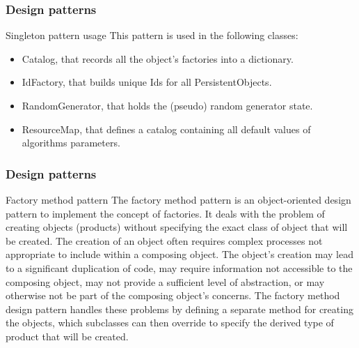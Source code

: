 \documentclass[8pt]{beamer}
\begin{document}
\begin{frame}
  \frametitle{Design patterns}
  \begin{block}{Singleton pattern usage}
    This pattern is used in the following classes:
    \begin{itemize}
    \item \alert{Catalog}, that records all the object's factories into a dictionary.
    \item \alert{IdFactory}, that builds unique Ids for all PersistentObjects.
    \item \alert{RandomGenerator}, that holds the (pseudo) random generator state.
    \item \alert{ResourceMap}, that defines a catalog containing all default values of algorithms parameters.
    \end{itemize}
  \end{block}
\end{frame}

\begin{frame}
  \frametitle{Design patterns}
  \begin{block}{Factory method pattern}
    The \alert{factory method pattern} is an object-oriented design pattern to implement the concept of factories. It deals with the problem of creating objects (products) without specifying the exact class of object that will be created. The creation of an object often requires complex processes not appropriate to include within a composing object. The object's creation may lead to a significant duplication of code, may require information not accessible to the composing object, may not provide a sufficient level of abstraction, or may otherwise not be part of the composing object's concerns. The factory method design pattern handles these problems by defining a separate method for creating the objects, which subclasses can then override to specify the derived type of product that will be created.
  \end{block}
  \vspace{1mm}
  \centering {}
\end{frame}
\end{document}
